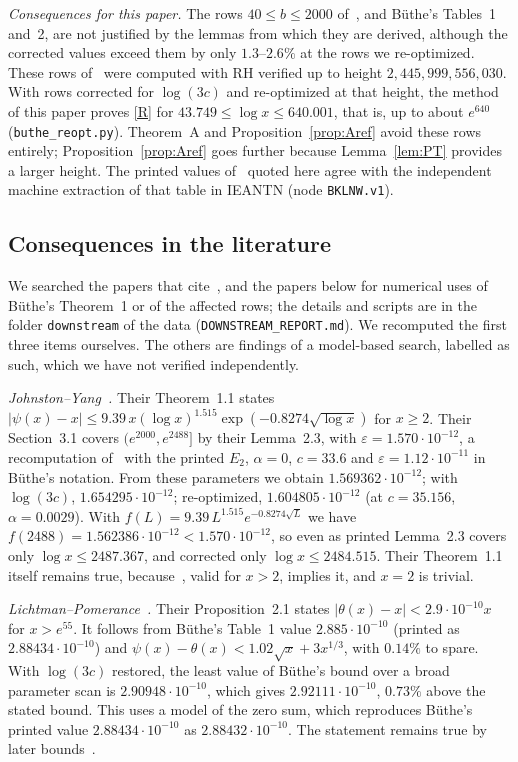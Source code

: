 \documentclass{amsart}
\theoremstyle{definition}
\theoremstyle{remark}
\theoremstyle{plain}
\numberwithin{equation}{section}
\newcommand{\eps}{\varepsilon}
\begin{document}
\emph{Consequences for this paper.} The rows $40\le b\le2000$ of~\cite[Table~8]{BKLNW21}, and B\"uthe's Tables~1 and~2, are not justified by the lemmas from which they are derived, although the corrected values exceed them by only $1.3$--$2.6\%$ at the rows we re-optimized. These rows of~\cite[Table~8]{BKLNW21} were computed with RH verified up to height $2{,}445{,}999{,}556{,}030$. With rows corrected for $\log(3c)$ and re-optimized at that height, the method of this paper proves \eqref{R} for $43.749\le\log x\le640.001$, that is, up to about $e^{640}$ (\texttt{buthe\_reopt.py}). Theorem~A and Proposition~\ref{prop:Aref} avoid these rows entirely; Proposition~\ref{prop:Aref} goes further because Lemma~\ref{lem:PT} provides a larger height. The printed values of~\cite[Table~8]{BKLNW21} quoted here agree with the independent machine extraction of that table in IEANTN (node \texttt{BKLNW.v1}).

\subsection{Consequences in the literature}\label{sec:downstream}
We searched the papers that cite~\cite{But16}, \cite{BKLNW21} and the papers below for numerical uses of B\"uthe's Theorem~1 or of the affected rows; the details and scripts are in the folder \texttt{downstream} of the data (\texttt{DOWNSTREAM\_REPORT.md}). We recomputed the first three items ourselves. The others are findings of a model-based search, labelled as such, which we have not verified independently.

\emph{Johnston--Yang~\cite{JY23}.} Their Theorem~1.1 states $|\psi(x)-x|\le9.39\,x(\log x)^{1.515}\exp(-0.8274\sqrt{\log x})$ for $x\ge2$. Their Section~3.1 covers $(e^{2000},e^{2488}]$ by their Lemma~2.3, with $\eps=1.570\cdot10^{-12}$, a recomputation of~\cite[Thm.~1]{But16} with the printed $E_2$, $\alpha=0$, $c=33.6$ and $\eps=1.12\cdot10^{-11}$ in B\"uthe's notation. From these parameters we obtain $1.569362\cdot10^{-12}$; with $\log(3c)$, $1.654295\cdot10^{-12}$; re-optimized, $1.604805\cdot10^{-12}$ (at $c=35.156$, $\alpha=0.0029$). With $f(L)=9.39\,L^{1.515}e^{-0.8274\sqrt L}$ we have $f(2488)=1.562386\cdot10^{-12}<1.570\cdot10^{-12}$, so even as printed Lemma~2.3 covers only $\log x\le2487.367$, and corrected only $\log x\le2484.515$. Their Theorem~1.1 itself remains true, because~\cite[Cor.~1.4]{FKS23}, valid for $x>2$, implies it, and $x=2$ is trivial.

\emph{Lichtman--Pomerance~\cite{LP18}.} Their Proposition~2.1 states $|\theta(x)-x|<2.9\cdot10^{-10}x$ for $x>e^{55}$. It follows from B\"uthe's Table~1 value $2.885\cdot10^{-10}$ (printed as $2.88434\cdot10^{-10}$) and $\psi(x)-\theta(x)<1.02\sqrt x+3x^{1/3}$, with $0.14\%$ to spare. With $\log(3c)$ restored, the least value of B\"uthe's bound over a broad parameter scan is $2.90948\cdot10^{-10}$, which gives $2.92111\cdot10^{-10}$, $0.73\%$ above the stated bound. This uses a model of the zero sum, which reproduces B\"uthe's printed value $2.88434\cdot10^{-10}$ as $2.88432\cdot10^{-10}$. The statement remains true by later bounds~\cite[Table~2]{FKS23b}.
\end{document}
